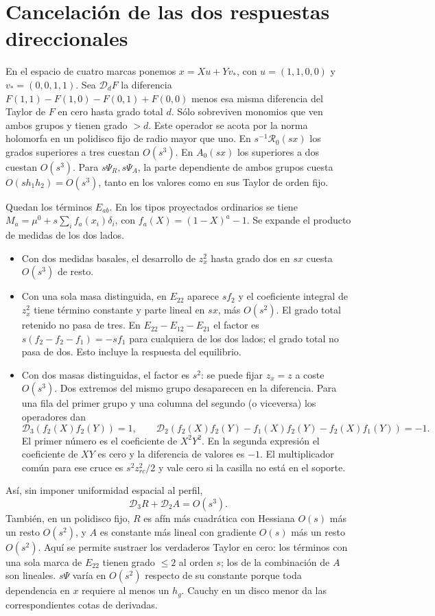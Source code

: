 \section{Cancelación de las dos respuestas direccionales}
En el espacio de cuatro marcas ponemos $x=Xu+Yv_*$, con
$u=(1,1,0,0)$ y $v_*=(0,0,1,1)$. Sea $\mathcal D_d F$ la diferencia
$F(1,1)-F(1,0)-F(0,1)+F(0,0)$ menos esa misma diferencia del Taylor de $F$ en cero
hasta grado total $d$. Sólo sobreviven monomios que ven ambos grupos y tienen grado $>d$.
Este operador se acota por la norma holomorfa en un polidisco fijo de radio mayor que uno.
En $s^{-1}\mathcal R_0(sx)$ los grados superiores a tres cuestan $O(s^3)$.
En $A_0(sx)$ los superiores a dos cuestan $O(s^3)$.
Para $s\Psi_R,s\Psi_A$, la parte dependiente de ambos grupos cuesta
$O(s h_1h_2)=O(s^3)$, tanto en los valores como en sus Taylor de orden fijo.

Quedan los términos $E_{ab}$. En los tipos proyectados ordinarios se tiene
$M_a=\mu^0+s\sum_i f_a(x_i)\delta_i$, con $f_a(X)=(1-X)^a-1$.
Se expande el producto de medidas de los dos lados.
\begin{itemize}
\item Con dos medidas basales, el desarrollo de $z_x^2$ hasta grado dos
en $sx$ cuesta $O(s^3)$ de resto.
\item Con una sola masa distinguida, en $E_{22}$ aparece $s f_2$ y el
coeficiente integral de $z_x^2$ tiene término constante y parte lineal en $sx$,
más $O(s^2)$. El grado total retenido no pasa de tres. En $E_{22}-E_{12}-E_{21}$
el factor es $s(f_2-f_2-f_1)=-sf_1$ para cualquiera de los dos lados;
el grado total no pasa de dos. Esto incluye la respuesta del equilibrio.
\item Con dos masas distinguidas, el factor es $s^2$: se puede fijar $z_x=z$
a coste $O(s^3)$. Dos extremos del mismo grupo desaparecen en la diferencia.
Para una fila del primer grupo y una columna del segundo (o viceversa) los operadores dan
\[
 \mathcal D_3(f_2(X)f_2(Y))=1,\qquad
 \mathcal D_2(f_2(X)f_2(Y)-f_1(X)f_2(Y)-f_2(X)f_1(Y))=-1.
\]
El primer número es el coeficiente de $X^2Y^2$. En la segunda expresión el coeficiente
de $XY$ es cero y la diferencia de valores es $-1$. El multiplicador común para
ese cruce es $s^2 z_{rc}^2/2$ y vale cero si la casilla no está en el soporte.
\end{itemize}
Así, sin imponer uniformidad espacial al perfil,
\[
 \mathcal D_3 R+\mathcal D_2 A=O(s^3).
\]
También, en un polidisco fijo, $R$ es afín más cuadrática con Hessiana $O(s)$
más un resto $O(s^2)$, y $A$ es constante más lineal con gradiente $O(s)$
más un resto $O(s^2)$. Aquí se permite sustraer los verdaderos Taylor en cero:
los términos con una sola marca de $E_{22}$ tienen grado $\le2$ al orden $s$;
los de la combinación de $A$ son lineales. $s\Psi$ varía en $O(s^2)$ respecto de
su constante porque toda dependencia en $x$ requiere al menos un $h_g$.
Cauchy en un disco menor da las correspondientes cotas de derivadas.
